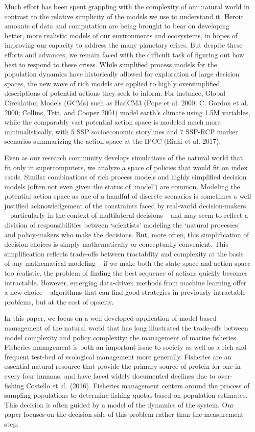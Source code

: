 \documentclass{article}
\begin{document}
Much effort has been spent grappling with the complexity of our natural
world in contrast to the relative simplicity of the models we use to
understand it. Heroic amounts of data and computation are being brought
to bear on developing better, more realistic models of our environments
and ecosystems, in hopes of improving our capacity to address the many
planetary crises. But despite these efforts and advances, we remain
faced with the difficult task of figuring out how best to respond to
these crises. While simplified process models for the population
dynamics have historically allowed for exploration of large decision
spaces, the new wave of rich models are applied to highly oversimplified
descriptions of potential actions they seek to inform. For instance,
Global Circulation Models (GCMs) such as HadCM3 (Pope et al. 2000; C.
Gordon et al. 2000; Collins, Tett, and Cooper 2001) model earth's
climate using 1.5M variables, while the comparably vast potential action
space is modeled much more minimalistically, with 5 SSP socioeconomic
storylines and 7 SSP-RCP marker scenarios summarizing the action space
at the IPCC (Riahi et al. 2017).

Even as our research community develops simulations of the natural world
that fit only in supercomputers, we analyze a space of policies that
would fit on index cards. Similar combinations of rich process models
and highly simplified decision models (often not even given the status
of `model') are common. Modeling the potential action space as one of a
handful of discrete scenarios is sometimes a well justified
acknowledgement of the constraints faced by real-world decision-makers
-- particularly in the context of multilateral decisions -- and may seem
to reflect a division of responsibilities between `scientists' modeling
the `natural processes' and policy-makers who make the decisions. But,
more often, this simplification of decision choices is simply
mathematically or conceptually convenient. This simplification reflects
trade-offs between tractablity and complexity at the basis of any
mathematical modeling -- if we make both the state space and action
space too realistic, the problem of finding the best sequence of actions
quickly becomes intractable. However, emerging data-driven methods from
machine learning offer a new choice -- algorithms that can find good
strategies in previously intractable problems, but at the cost of
opacity.

In this paper, we focus on a well-developed application of model-based
management of the natural world that has long illustrated the trade-offs
between model complexity and policy complexity: the management of marine
fisheries. Fisheries management is both an important issue to society as
well as a rich and frequent test-bed of ecological management more
generally. Fisheries are an essential natural resource that provide the
primary source of protein for one in every four humans, and have faced
widely documented declines due to over-fishing Costello et al. (2016).
Fisheries management centers around the process of sampling populations
to determine fishing quotas based on population estimates. This decision
is often guided by a model of the dynamics of the system. Our paper
focuses on the decision side of this problem rather than the measurement
step.
\end{document}
